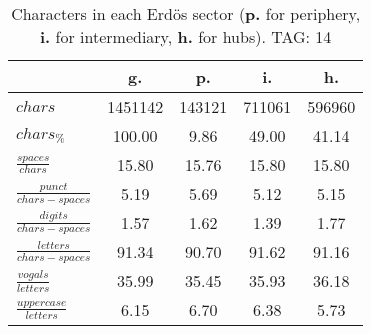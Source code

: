 \begin{table}[h!]
\begin{center}
\begin{tabular}{| l || c | c | c | c |}\hline
 & {\bf g.} & {\bf p.} & {\bf i.} & {\bf h.} \\\hline\hline
$chars$ & 1451142  & 143121  & 711061  & 596960 \\
$chars_{\%}$ & 100.00  & 9.86  & 49.00  & 41.14 \\\hline
$\frac{spaces}{chars}$ & 15.80  & 15.76  & 15.80  & 15.80 \\
$\frac{punct}{chars-spaces}$ & 5.19  & 5.69  & 5.12  & 5.15 \\
$\frac{digits}{chars-spaces}$ & 1.57  & 1.62  & 1.39  & 1.77 \\\hline
$\frac{letters}{chars-spaces}$ & 91.34  & 90.70  & 91.62  & 91.16 \\
$\frac{vogals}{letters}$ & 35.99  & 35.45  & 35.93  & 36.18 \\
$\frac{uppercase}{letters}$ & 6.15  & 6.70  & 6.38  & 5.73 \\\hline
\end{tabular}
\caption{Characters in each Erd\"os sector ({{\bf p.}} for periphery, {{\bf i.}} for intermediary, 
    {{\bf h.}} for hubs). TAG: 14}
\end{center}
\end{table}